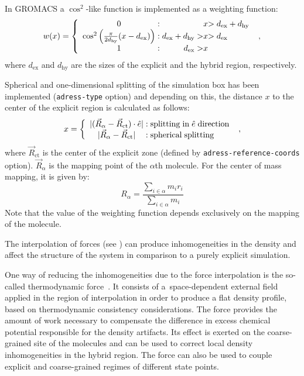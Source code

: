 In GROMACS a $\cos^2$-like function is implemented as a weighting function:
\begin{equation}
w(x)=
\left\{\begin{array}{c@{\;:\;}r@{x}l}
0&&>d_\mathrm{ex}+d_\mathrm{hy}\\
\cos^2\left(\frac{\pi}{2d_\mathrm{hy}}(x-d_\mathrm{ex})\right)&d_\mathrm{ex}+d_\mathrm{hy}>&>d_\mathrm{ex}\\
1&d_\mathrm{ex}>&
\end{array}\right.~,
\label{equ:wf}
\end{equation}
where $d_\mathrm{ex}$ and $d_\mathrm{hy}$ are the sizes of the explicit and the hybrid region, respectively.

Spherical and one-dimensional splitting  of the simulation box has been implemented ({\tt adress-type} option)
and depending on this, the distance $x$ to the center of the explicit region is calculated as follows:
\begin{equation}
x=
\left\{
\begin{array}{c@{\;:\;}l}
  |(\vec{R}_\alpha-\vec{R}_\mathrm{ct})\cdot\hat{e}|&\mathrm{splitting\;in\;}\hat{e}\mathrm{\;direction}\\
|\vec{R}_\alpha-\vec{R}_\mathrm{ct}|&\mathrm{spherical\;splitting}
\end{array}
\right.~,
\end{equation}
where $\vec{R}_\mathrm{ct}$ is the center of the explicit zone (defined by {\tt adress-reference-coords} option). $\vec{R}_\alpha$ is the mapping point of the $\alpha$th molecule. For the center of mass mapping, it is given by:
\begin{equation}
R_\alpha=\frac{\sum_{i\in\alpha}m_i r_i}{\sum_{i\in\alpha}m_i}
\label{equ:com-def}
\end{equation}
Note that the value of the weighting function depends exclusively on the mapping of the molecule.

The interpolation of forces (see ) can produce inhomogeneities in the density and affect the structure of the system in comparison to a purely explicit simulation.

One way of reducing the inhomogeneities due to the force interpolation is the so-called thermodynamic force~\cite{Poblete2010}.
It consists of a~space-dependent external field applied in the region of interpolation in order to produce a flat density profile, based on thermodynamic consistency considerations. The force provides the amount of work necessary to compensate the difference in excess chemical potential responsible for the density artifacts.
Its effect is exerted on the coarse-grained site of the molecules and can be used to correct local density inhomogeneities in the hybrid region.
The force can also be used to couple explicit and coarse-grained regimes of different state points.

